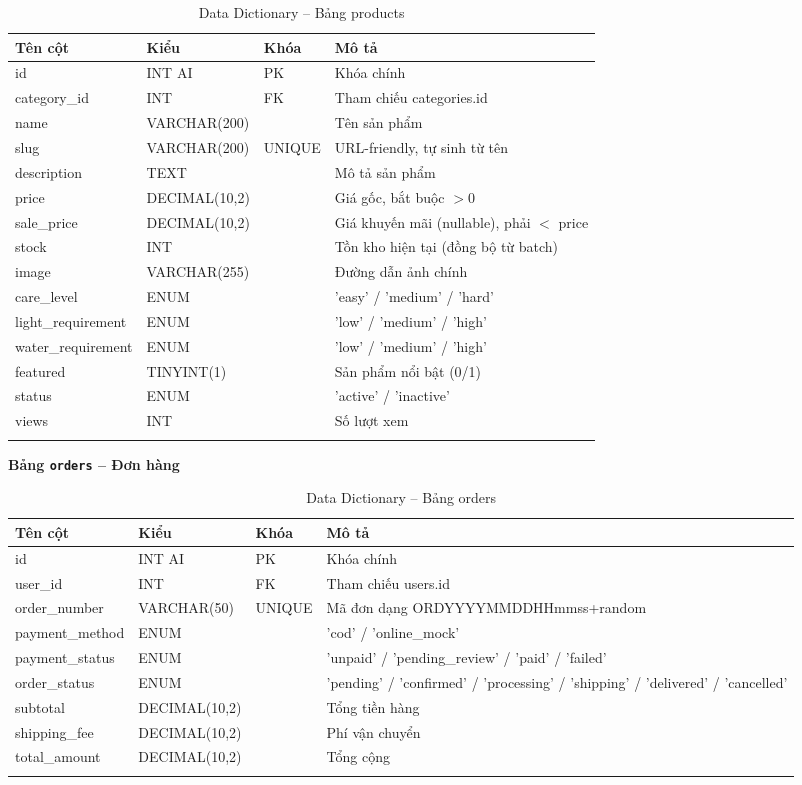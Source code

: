 \documentclass[a4paper]{article}
\begin{document}
\begin{longtable}{|p{3.5cm}|p{2.5cm}|p{1.5cm}|p{5cm}|}
\hline
\textbf{Tên cột} & \textbf{Kiểu} & \textbf{Khóa} & \textbf{Mô tả} \\
\hline
\endhead
id & INT AI & PK & Khóa chính \\
\hline
category\_id & INT & FK & Tham chiếu categories.id \\
\hline
name & VARCHAR(200) & & Tên sản phẩm \\
\hline
slug & VARCHAR(200) & UNIQUE & URL-friendly, tự sinh từ tên \\
\hline
description & TEXT & & Mô tả sản phẩm \\
\hline
price & DECIMAL(10,2) & & Giá gốc, bắt buộc $> 0$ \\
\hline
sale\_price & DECIMAL(10,2) & & Giá khuyến mãi (nullable), phải $<$ price \\
\hline
stock & INT & & Tồn kho hiện tại (đồng bộ từ batch) \\
\hline
image & VARCHAR(255) & & Đường dẫn ảnh chính \\
\hline
care\_level & ENUM & & 'easy' / 'medium' / 'hard' \\
\hline
light\_requirement & ENUM & & 'low' / 'medium' / 'high' \\
\hline
water\_requirement & ENUM & & 'low' / 'medium' / 'high' \\
\hline
featured & TINYINT(1) & & Sản phẩm nổi bật (0/1) \\
\hline
status & ENUM & & 'active' / 'inactive' \\
\hline
views & INT & & Số lượt xem \\
\hline
\caption{Data Dictionary -- Bảng products}
\end{longtable}

\textbf{Bảng \texttt{orders} -- Đơn hàng}

\begin{longtable}{|p{3.5cm}|p{2.5cm}|p{1.5cm}|p{5cm}|}
\hline
\textbf{Tên cột} & \textbf{Kiểu} & \textbf{Khóa} & \textbf{Mô tả} \\
\hline
\endhead
id & INT AI & PK & Khóa chính \\
\hline
user\_id & INT & FK & Tham chiếu users.id \\
\hline
order\_number & VARCHAR(50) & UNIQUE & Mã đơn dạng ORDYYYYMMDDHHmmss+random \\
\hline
payment\_method & ENUM & & 'cod' / 'online\_mock' \\
\hline
payment\_status & ENUM & & 'unpaid' / 'pending\_review' / 'paid' / 'failed' \\
\hline
order\_status & ENUM & & 'pending' / 'confirmed' / 'processing' / 'shipping' / 'delivered' / 'cancelled' \\
\hline
subtotal & DECIMAL(10,2) & & Tổng tiền hàng \\
\hline
shipping\_fee & DECIMAL(10,2) & & Phí vận chuyển \\
\hline
total\_amount & DECIMAL(10,2) & & Tổng cộng \\
\hline
\caption{Data Dictionary -- Bảng orders}
\end{longtable}
\end{document}

